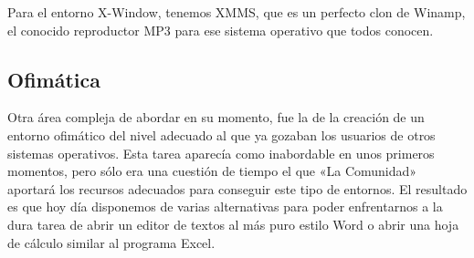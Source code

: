 Para el entorno {\sf X-Window}, tenemos {\sf XMMS}, que es un perfecto
clon de  {\sf Winamp},  el conocido reproductor  MP3 para  ese sistema
operativo que todos conocen.

\subsection{Ofimática}

Otra área compleja de abordar en su  momento, fue la de la creación de
un entorno ofimático del nivel adecuado al que ya gozaban los usuarios
de otros sistemas operativos. Esta  tarea aparecía como inabordable en
unos primeros  momentos, pero sólo era  una cuestión de tiempo  el que
«La  Comunidad» aportará  los recursos  adecuados para  conseguir este
tipo de  entornos. El resultado  es que  hoy día disponemos  de varias
alternativas  para poder  enfrentarnos a  la  dura tarea  de abrir  un
editor de  textos al más  puro estilo {\sf Word}  o abrir una  hoja de
cálculo similar al programa {\sf Excel}.







